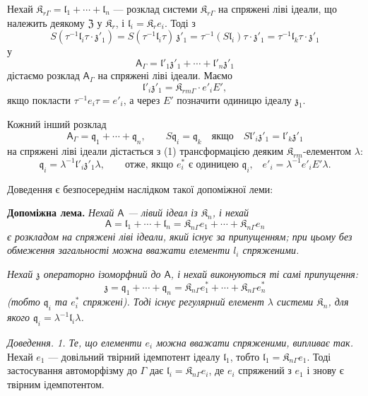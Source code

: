 \documentclass[11pt]{article}
\begin{document}
Нехай \(\mathfrak K_{r\Gamma}=\mathfrak l_1+\cdots+\mathfrak l_n\) --- розклад системи \(\mathfrak K_{r\Gamma}\) на спряжені ліві ідеали, що належить деякому \(\mathfrak Z\) у \(\mathfrak K_r\), і \(\mathfrak l_i=\mathfrak K_re_i\). Тоді з
\[
S(\tau^{-1}\mathfrak l_i\tau\cdot\mathfrak z'_1)
=S(\tau^{-1}\mathfrak l_i\tau)\,\mathfrak z'_1
=\tau^{-1}(S\mathfrak l_i)\tau\cdot\mathfrak z'_1
=\tau^{-1}\mathfrak l_k\tau\cdot\mathfrak z'_1
\]
у
\[
\tag{1}
\mathsf{A}_\Gamma=\mathfrak l'_1\mathfrak z'_1+\cdots+\mathfrak l'_n\mathfrak z'_1
\]
дістаємо розклад \(\mathsf{A}_\Gamma\) на спряжені ліві ідеали. Маємо
\[
\mathfrak l'_i\mathfrak z'_1=\mathfrak K_{rm\Gamma}\cdot e'_iE',
\]
якщо покласти \(\tau^{-1}e_i\tau=e'_i\), а через \(E'\) позначити одиницю ідеалу \(\mathfrak z_1\).

Кожний інший розклад
\[
\tag{2}
\mathsf{A}_\Gamma=\mathfrak q_1+\cdots+\mathfrak q_n,\qquad
S\mathfrak q_i=\mathfrak q_k\quad\text{якщо}\quad
S\mathfrak l'_i\mathfrak z'_1=\mathfrak l'_k\mathfrak z'_1
\]
на спряжені ліві ідеали дістається з (1) трансформацією деяким \(\mathfrak K_{rm}\)-елементом \(\lambda\):
\[
\mathfrak q_i=\lambda^{-1}\mathfrak l'_i\mathfrak z'_1\lambda,
\qquad
\text{отже, якщо \(e_i^*\) є одиницею \(\mathfrak q_i\),}\quad
e'_i=\lambda^{-1}e'_iE'\lambda.
\]

Доведення є безпосереднім наслідком такої допоміжної леми:

\textbf{Допоміжна лема.} \emph{Нехай \(\mathsf{A}\) --- лівий ідеал із \(\mathfrak K_n\), і нехай}
\[
\mathsf{A}=\mathfrak l_1+\cdots+\mathfrak l_n
=\mathfrak K_{n\Gamma}e_1+\cdots+\mathfrak K_{n\Gamma}e_n
\]
\emph{є розкладом на спряжені ліві ідеали, який існує за припущенням; при цьому без обмеження загальності можна вважати елементи \(l_i\) спряженими.}

\emph{Нехай \(\mathfrak z\) операторно ізоморфний до \(\mathsf{A}\), і нехай виконуються ті самі припущення:}
\[
\mathfrak z=\mathfrak q_1+\cdots+\mathfrak q_n
=\mathfrak K_{n\Gamma}e_1^*+\cdots+\mathfrak K_{n\Gamma}e_n^*
\]
\emph{(тобто \(\mathfrak q_i\) та \(e_i^*\) спряжені). Тоді існує регулярний елемент \(\lambda\) системи \(\mathfrak K_n\), для якого \(\mathfrak q_i=\lambda^{-1}\mathfrak l_i\lambda\).}

\emph{Доведення. 1. Те, що елементи \(e_i\) можна вважати спряженими, випливає так.} Нехай \(e_1\) --- довільний твірний ідемпотент ідеалу \(\mathfrak l_1\), тобто \(\mathfrak l_1=\mathfrak K_{n\Gamma}e_1\). Тоді застосування автоморфізму до \(\Gamma\) дає \(\mathfrak l_i=\mathfrak K_{n\Gamma}e_i\), де \(e_i\) спряжений з \(e_1\) і знову є твірним ідемпотентом.
\end{document}
